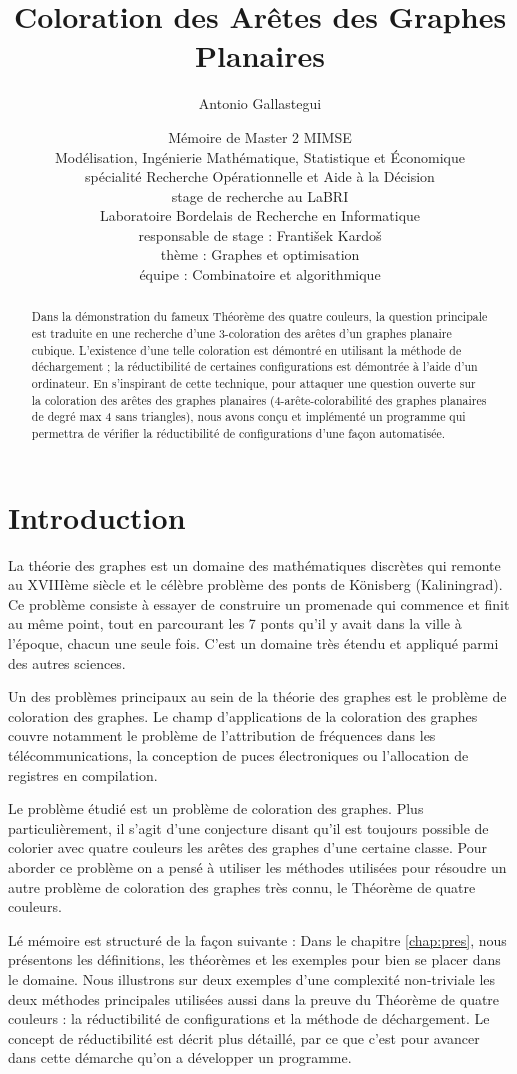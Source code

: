 \documentclass[10pt,a4paper]{article}
\title{Coloration des Arêtes des Graphes Planaires}
\author{Antonio Gallastegui
 }
\date{
 Mémoire de Master 2 MIMSE \\
  Modélisation, Ingénierie Mathématique, Statistique et Économique \\
  spécialité Recherche Opérationnelle et Aide à la Décision \\\bigskip
  stage de recherche au LaBRI\\
  Laboratoire Bordelais de Recherche en Informatique \\
  responsable de stage : Franti\v sek Kardo\v s  \\
  thème : Graphes et optimisation \\
  équipe : Combinatoire et algorithmique  \\
 }
\begin{document}
\thispagestyle{empty}
\maketitle

\begin{abstract}
Dans la démonstration du fameux Théorème des quatre couleurs, la question principale est traduite en une recherche d'une 3-coloration des arêtes d'un graphes planaire cubique. L'existence d'une telle coloration est démontré en utilisant la méthode de déchargement ; la réductibilité de certaines configurations est démontrée à l'aide d'un ordinateur. En s'inspirant de cette technique, pour attaquer une question ouverte sur la coloration des arêtes des graphes planaires (4-arête-colorabilité des graphes planaires de degré max 4 sans triangles), nous avons conçu et implémenté un programme qui permettra de vérifier la réductibilité de configurations d'une façon automatisée. 
\end{abstract}

\section*{Introduction}
La théorie des graphes est un domaine des mathématiques discrètes qui remonte au XVIIIème siècle et le célèbre problème des ponts de Könisberg (Kaliningrad). Ce problème consiste à essayer de construire un promenade qui commence et finit au même point, tout en parcourant les 7 ponts qu'il y avait dans la ville à l'époque, chacun une seule fois. C'est un domaine très étendu et appliqué parmi des autres sciences. 

Un des problèmes principaux au sein de la théorie des graphes est le problème de coloration des graphes. Le champ d'applications de la coloration des graphes couvre notamment le problème de l'attribution de fréquences dans les télécommunications, la conception de puces électroniques ou l'allocation de registres en compilation.

Le problème étudié est un problème de coloration des graphes. Plus particulièrement, il s'agit d'une conjecture disant qu'il est toujours possible  de colorier avec quatre couleurs les arêtes des graphes d'une certaine classe. Pour aborder ce problème on a pensé à utiliser les méthodes utilisées pour résoudre un autre problème de coloration des graphes très connu, le Théorème de quatre couleurs. 

Lé mémoire est structuré de la façon suivante :
Dans le chapitre \ref{chap:pres}, nous présentons les définitions, les théorèmes et les exemples pour bien se placer dans le domaine. Nous illustrons sur deux exemples d'une complexité non-triviale les deux méthodes principales utilisées aussi dans la preuve du Théorème de quatre couleurs : la réductibilité de configurations et la méthode de déchargement. Le concept de réductibilité est décrit plus détaillé, par ce que c'est pour avancer dans cette démarche qu'on a développer un programme.
\end{document}

